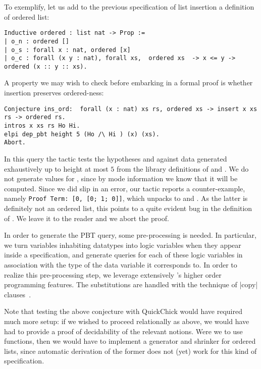 To exemplify, let us add to the previous specification of list
insertion a definition of ordered list:
\begin{lstlisting}
Inductive ordered : list nat -> Prop :=
| o_n : ordered []
| o_s : forall x : nat, ordered [x]
| o_c : forall (x y : nat), forall xs,  ordered xs  -> x <= y -> ordered (x :: y :: xs).     
\end{lstlisting}
%
A property we may wish to check before embarking in a formal proof is
whether insertion preserves ordered-ness:
\begin{lstlisting}
Conjecture ins_ord:  forall (x : nat) xs rs, ordered xs -> insert x xs rs -> ordered rs.
intros x xs rs Ho Hi.
elpi dep_pbt height 5 (Ho /\ Hi ) (x) (xs).
Abort.
\end{lstlisting}
In this query the tactic tests the hypotheses  and 
against data  generated exhaustively up to height
at most $5$  from the library  definitions of
 and . We do not generate values for ,
since by mode information we know that it will be computed.
%
Since we did slip in an error, our tactic reports a counter-example,
namely \verb|Proof Term: [0, [0; 1; 0]]|, which unpacks to 
and . As the latter is definitely not an
ordered list, this points to a quite evident bug in the definition of
. We leave it to the reader and we abort the proof.


In order to generate the PBT query, some
pre-processing is needed. In particular, we turn 
variables inhabiting datatypes into \lP logic variables when they appear inside a
specification, and  generate queries %
for each of
these logic variables in association with the type of the data
variable it corresponds to.  In order to realize this pre-processing step,
we leverage extensively \lP's higher order programming features. The
substitutions are handled with the technique of \lsti|copy| clauses~\cite{miller91jlc}.

Note that testing the above conjecture with \textsf{QuickChick} would
have required much more setup: if we wished to proceed relationally as
above, we would have had to provide a proof of decidability of the
relevant notions. Were we to use functions, then we would have to
implement a generator and shrinker for ordered lists, since automatic
derivation of the former does not (yet) work for this kind of specification.


